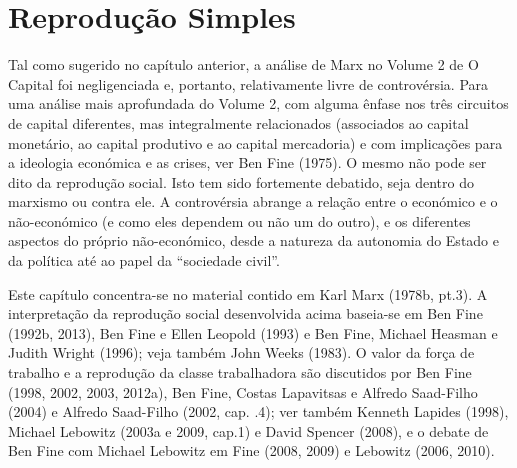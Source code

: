 \section{Reprodução Simples}
 \par 
Tal como sugerido no capítulo anterior, a análise de Marx no Volume {\color{blue}2} de O Capital foi negligenciada e, portanto, relativamente livre de controvérsia. Para uma análise mais aprofundada do Volume 2, com alguma ênfase nos três circuitos de capital diferentes, mas integralmente relacionados (associados ao capital monetário, ao capital produtivo e ao capital mercadoria) e com implicações para a ideologia económica e as crises, ver Ben Fine (1975). O mesmo não pode ser dito da reprodução social. Isto tem sido fortemente debatido, seja dentro do marxismo ou contra ele. A controvérsia abrange a relação entre o económico e o não-económico (e como eles dependem ou não um do outro), e os diferentes aspectos do próprio não-económico, desde a natureza da autonomia do Estado e da política até ao papel da “sociedade civil”.
 \par 
Este capítulo concentra-se no material contido em Karl Marx (1978b, pt.{\color{blue}3}). A interpretação da reprodução social desenvolvida acima baseia-se em Ben Fine (1992b, 2013), Ben Fine e Ellen Leopold (1993) e Ben Fine, Michael Heasman e Judith Wright (1996); veja também John Weeks (1983). O valor da força de trabalho e a reprodução da classe trabalhadora são discutidos por Ben Fine (1998, 2002, 2003, 2012a), Ben Fine, Costas Lapavitsas e Alfredo Saad-Filho (2004) e Alfredo Saad-Filho (2002, cap. .{\color{blue}4}); ver também Kenneth Lapides (1998), Michael Lebowitz (2003a e 2009, cap.{\color{blue}1}) e David Spencer (2008), e o debate de Ben Fine com Michael Lebowitz em Fine (2008, 2009) e Lebowitz (2006, 2010).